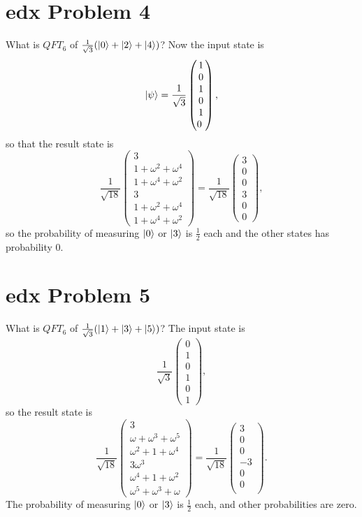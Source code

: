 \documentclass[10pt]{article}
\begin{document}
\section*{edx Problem 4}
What is $QFT_6$ of $\frac{1}{\sqrt{3}} ( \ket{0} + \ket{2} + \ket{4} )$? Now the input state is
\[
\ket{\psi} = 
\frac{1}{\sqrt{3}}
\begin{pmatrix}
1 \\ 0 \\ 1 \\ 0 \\ 1 \\ 0 \
\end{pmatrix},
\]
so that the result state is
\[
\frac{1}{\sqrt{18}}
\begin{pmatrix}
3 \\
1 + \omega^2 + \omega^4 \\
1 + \omega^4 + \omega^2 \\
3 \\
1 + \omega^2 + \omega^4 \\
1 + \omega^4 + \omega^2 
\end{pmatrix}
= 
\frac{1}{\sqrt{18}}
\begin{pmatrix}
3 \\
0 \\
0 \\
3 \\
0 \\
0
\end{pmatrix},
\]
 so the probability of measuring $\ket{0}$ or $\ket{3}$ is $\frac{1}{2}$ each and the other states has probability 0.

\section*{edx Problem 5}
What is $QFT_6$ of $\frac{1}{\sqrt{3}} ( \ket{1} + \ket{3} + \ket{5} )$? The input state is
\[
\frac{1}{\sqrt{3}}
\begin{pmatrix}
0 \\ 1 \\ 0 \\ 1 \\ 0 \\ 1 
\end{pmatrix},
\] 
so the result state is 
\[
\frac{1}{\sqrt{18}}
\begin{pmatrix}
3 \\
\omega + \omega^3 + \omega^5 \\
\omega^2 + 1 + \omega^4 \\
3 \omega^3 \\
\omega^4 + 1 + \omega^2 \\
\omega^5 + \omega^3 + \omega
\end{pmatrix}
= 
\frac{1}{\sqrt{18}}
\begin{pmatrix}
3 \\ 0 \\ 0 \\ -3 \\ 0 \\ 0 \\
\end{pmatrix}.
\]
 The probability of measuring $\ket{0}$ or $\ket{3}$ is $\frac{1}{2}$ each, and other probabilities are zero.
 
\end{document}
